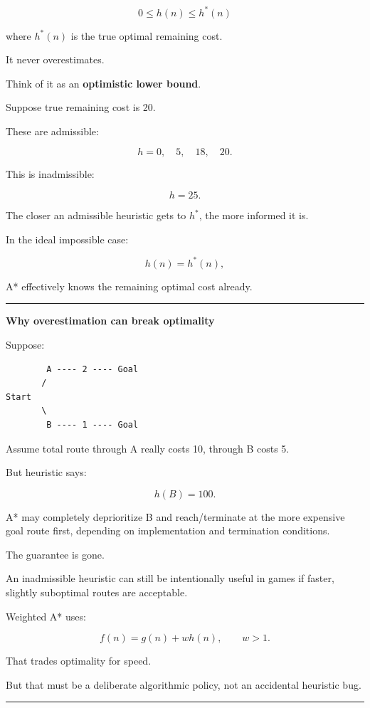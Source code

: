 \[
\boxed{
0\le h(n)\le h^*(n)
}
\]

where \(h^*(n)\) is the true optimal remaining cost.

It never overestimates.

Think of it as an \textbf{optimistic lower bound}.

Suppose true remaining cost is 20.

These are admissible:

\[
h=0,\quad5,\quad18,\quad20.
\]

This is inadmissible:

\[
h=25.
\]

The closer an admissible heuristic gets to \(h^*\), the more informed it is.

In the ideal impossible case:

\[
h(n)=h^*(n),
\]

A* effectively knows the remaining optimal cost already.

\begin{center}\rule{0.5\linewidth}{0.5pt}\end{center}

\textbf{Why overestimation can break optimality}

Suppose:

\begin{verbatim}
        A ---- 2 ---- Goal
       /
Start
       \
        B ---- 1 ---- Goal
\end{verbatim}

Assume total route through A really costs 10, through B costs 5.

But heuristic says:

\[
h(B)=100.
\]

A* may completely deprioritize B and reach/terminate at the more expensive goal route first, depending on implementation and termination conditions.

The guarantee is gone.

An inadmissible heuristic can still be intentionally useful in games if faster, slightly suboptimal routes are acceptable.

Weighted A* uses:

\[
f(n)=g(n)+w h(n),
\qquad
w>1.
\]

That trades optimality for speed.

But that must be a deliberate algorithmic policy, not an accidental heuristic bug.

\begin{center}\rule{0.5\linewidth}{0.5pt}\end{center}

